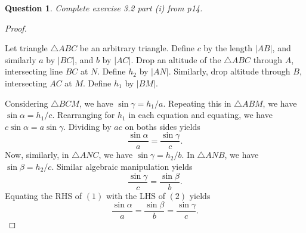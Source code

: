 \documentclass[12pt]{article}
\theoremstyle{customstyle}
\newtheorem{question}{Question}
\begin{document}
\begin{question}
    Complete exercise 3.2 part (i) from p14.
\end{question}


\begin{proof}
    {}\ 


    Let triangle $\triangle ABC$ be an arbitrary triangle.
    Define $c$ by the length $|AB|$,
    and similarly $a$ by $|BC|$, and $b$ by $|AC|$.
    Drop an altitude of the $\triangle ABC$ through $A$,
    intersecting line $BC$ at $N$. Define $h_{2}$ by $|AN|$.
    Similarly, drop altitude through $B$,
    intersecting $AC$ at $M$. Define $h_{1}$ by $|BM|$.

    Considering $\triangle BCM$, we have $\sin\gamma = h_{1}/a$.
    Repeating this in $\triangle ABM$, we have $\sin\alpha = h_{1}/c$.
    Rearranging for $h_{1}$ in each equation and equating,
    we have $c\sin\alpha = a\sin\gamma $. 
    Dividing by $ac$ on boths sides yields
    \begin{equation}
    \frac{\sin\alpha }{a} = \frac{\sin\gamma }{c}.
    \end{equation}
    Now, similarly,
    in $\triangle ANC$, we have $\sin\gamma = h_{2}/b$.
    In $\triangle ANB$, we have $\sin\beta = h_{2}/c$.
    Similar algebraic manipulation yields
    \begin{equation}
    \frac{\sin\gamma }{c} = \frac{\sin\beta }{b}.
    \end{equation}
    Equating the RHS of $(1)$ with the LHS of $(2)$ yields
    \[
    \frac{\sin\alpha }{a} = \frac{\sin\beta }{b} = \frac{\sin\gamma }{c}.
    \]
\end{proof}
\end{document}
